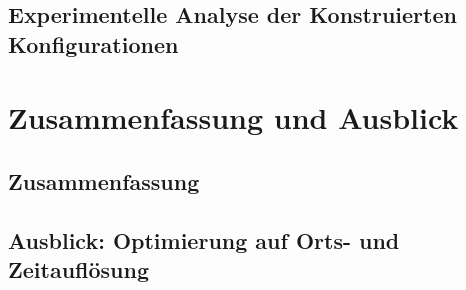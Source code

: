 	\section{Experimentelle Analyse der Konstruierten Konfigurationen}
	
\chapter{Zusammenfassung und Ausblick}
	\section{Zusammenfassung}
	
	\section{Ausblick: Optimierung auf Orts- und Zeitauflösung}
